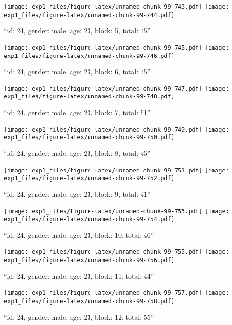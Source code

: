 \documentclass[,]{article}
\begin{document}
\texttt{[image: exp1\_files/figure-latex/unnamed-chunk-99-743.pdf]}
\texttt{[image: exp1\_files/figure-latex/unnamed-chunk-99-744.pdf]}

\newpage
[1] 

``id: 24, gender: male, age: 23, block: 5, total: 45''

\texttt{[image: exp1\_files/figure-latex/unnamed-chunk-99-745.pdf]}
\texttt{[image: exp1\_files/figure-latex/unnamed-chunk-99-746.pdf]}

\newpage
[1] 

``id: 24, gender: male, age: 23, block: 6, total: 45''

\texttt{[image: exp1\_files/figure-latex/unnamed-chunk-99-747.pdf]}
\texttt{[image: exp1\_files/figure-latex/unnamed-chunk-99-748.pdf]}

\newpage
[1] 

``id: 24, gender: male, age: 23, block: 7, total: 51''

\texttt{[image: exp1\_files/figure-latex/unnamed-chunk-99-749.pdf]}
\texttt{[image: exp1\_files/figure-latex/unnamed-chunk-99-750.pdf]}

\newpage
[1] 

``id: 24, gender: male, age: 23, block: 8, total: 45''

\texttt{[image: exp1\_files/figure-latex/unnamed-chunk-99-751.pdf]}
\texttt{[image: exp1\_files/figure-latex/unnamed-chunk-99-752.pdf]}

\newpage
[1] 

``id: 24, gender: male, age: 23, block: 9, total: 41''

\texttt{[image: exp1\_files/figure-latex/unnamed-chunk-99-753.pdf]}
\texttt{[image: exp1\_files/figure-latex/unnamed-chunk-99-754.pdf]}

\newpage
[1] 

``id: 24, gender: male, age: 23, block: 10, total: 46''

\texttt{[image: exp1\_files/figure-latex/unnamed-chunk-99-755.pdf]}
\texttt{[image: exp1\_files/figure-latex/unnamed-chunk-99-756.pdf]}

\newpage
[1] 

``id: 24, gender: male, age: 23, block: 11, total: 44''

\texttt{[image: exp1\_files/figure-latex/unnamed-chunk-99-757.pdf]}
\texttt{[image: exp1\_files/figure-latex/unnamed-chunk-99-758.pdf]}

\newpage
[1] 

``id: 24, gender: male, age: 23, block: 12, total: 55''
\end{document}
